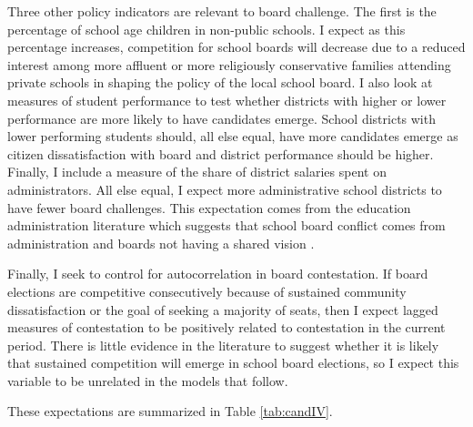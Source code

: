 Three other policy indicators are relevant to board challenge. The first is the 
percentage of school age children in non-public schools. I expect as this 
percentage increases, competition for school boards will decrease due to a 
reduced interest among more affluent or more religiously conservative 
families attending private schools in shaping the policy of the local 
school board. I also look at measures of student performance to test whether 
districts with higher or lower performance 
are more likely to have candidates emerge. School districts with lower performing 
students should, all else equal, have more candidates emerge as citizen dissatisfaction 
with board and district performance should be higher. Finally, I include a measure 
of the share of district salaries spent on administrators. All else equal, I expect 
more administrative school districts to have fewer board challenges. This 
expectation comes from the education administration literature which suggests 
that school board conflict comes from administration and boards not having a 
shared vision \citep{RefWorks:233}. 

Finally, I seek to control for autocorrelation in board contestation. If board 
elections are competitive consecutively because of sustained community dissatisfaction 
or the goal of seeking a majority of seats, then I expect lagged measures of 
contestation to be positively related to contestation in the current period. 
There is little evidence in the literature to suggest whether it is likely that 
sustained competition will emerge in school board elections, so I expect this 
variable to be unrelated in the models that follow. 

These expectations are summarized in Table \ref{tab:candIV}. 


